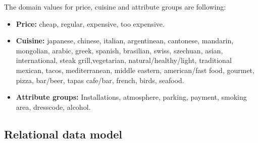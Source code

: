 The domain values for price,  cuisine and attribute groups are following:
\begin{itemize}
\item \textbf{Price:} cheap, regular, expensive, too expensive.
\item \textbf{Cuisine:} japanese, chinese, italian, argentinean,
cantonese, mandarin, mongolian, arabic, greek, spanish, brasilian,
swiss, szechuan, asian, international, steak grill,vegetarian,
natural/healthy/light, traditional mexican, tacos, mediterranean,
middle eastern, american/fast food, gourmet, pizza, bar/beer, tapas
cafe/bar, french, birds, seafood.
\item  \textbf{Attribute groups:} Installations, atmosphere, 
parking, payment, smoking area, dresscode, alcohol.
\end{itemize}

\subsection{Relational data model} 


